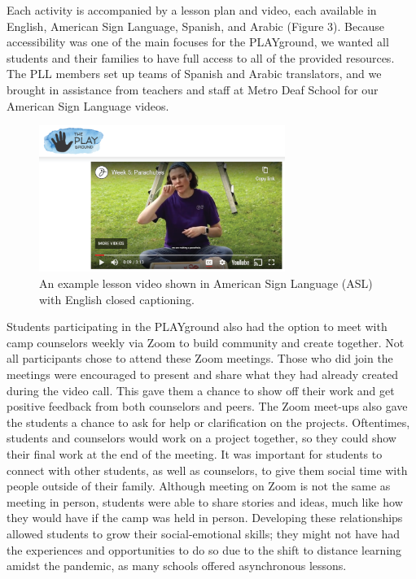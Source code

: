 \documentclass[11.5pt]{sig-alternate}
\begin{document}
\begin{large}
Each activity is accompanied by a lesson plan and video, each available in English, American Sign Language, Spanish, and Arabic (Figure 3). Because accessibility was one of the main focuses for the PLAYground, we wanted all students and their families to have full access to all of the provided resources. The PLL members set up teams of Spanish and Arabic translators, and we brought in assistance from teachers and staff at Metro Deaf School for our American Sign Language videos. 

\begin{figure}[h]
    \centering
    \includegraphics[width=8cm]{figure 3.png}
    \caption{An example lesson video shown in American Sign Language (ASL) with English closed captioning.}
\end{figure}

Students participating in the PLAYground also had the option to meet with camp counselors weekly via Zoom to build community and create together. Not all participants chose to attend these Zoom meetings. Those who did join the meetings were encouraged to present and share what they had already created during the video call. This gave them a chance to show off their work and get positive feedback from both counselors and peers. The Zoom meet-ups also gave the students a chance to ask for help or clarification on the projects. Oftentimes, students and counselors would work on a project together, so they could show their final work at the end of the meeting. It was important for students to connect with other students, as well as counselors, to give them social time with people outside of their family. Although meeting on Zoom is not the same as meeting in person, students were able to share stories and ideas, much like how they would have if the camp was held in person. Developing these relationships allowed students to grow their social-emotional skills; they might not have had the experiences and opportunities to do so due to the shift to distance learning amidst the pandemic, as many schools offered asynchronous lessons. 


\end{large}
\end{document}
